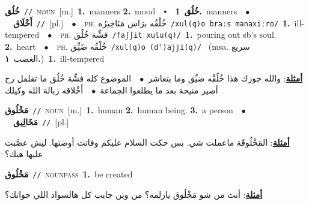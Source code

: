 \documentclass[10pt,a4paper,twoside]{article} %
\begin{document}
\begin{multicols}{2}
{\setlength\topsep{0pt}\textbf{\foreignlanguage{arabic}{خُلُق}}\ {\color{gray}\texttt{//}\color{black}}\ \textsc{noun}\ [m.]\ \textbf{1.}~manners  \textbf{2.}~mood\ \ $\smblkdiamond$\ \ \setlength\topsep{0pt}\textbf{\foreignlanguage{arabic}{خُلُق}}\ \textbf{1.}~manners\ \ $\bullet$\ \ \setlength\topsep{0pt}\textbf{\foreignlanguage{arabic}{أَخْلَاق}}\ {\color{gray}\texttt{//}\color{black}}\ [pl.]\ \ $\bullet$\ \ \textsc{ph.} \color{gray} \foreignlanguage{arabic}{خُلْقُه برَاس مَنَاخِيرُه}\color{black}\ {\color{gray}\texttt{/{\sffamily xul(q)o braːs manaxiːro}/}\color{black}}\ \textbf{1.}~ill-tempered\ \ $\bullet$\ \ \textsc{ph.} \color{gray} \foreignlanguage{arabic}{فشِّة خُلُق}\color{black}\ {\color{gray}\texttt{/{\sffamily faʃʃit xulu(q)}/}\color{black}}\ \textbf{1.}~pouring out sb's soul.  \textbf{2.}~heart\ \ $\bullet$\ \ \textsc{ph.} \color{gray} \foreignlanguage{arabic}{خُلْقُه ضَيِّق}\color{black}\ {\color{gray}\texttt{/{\sffamily xul(q)o (dˤ)ajji(q)}/}\color{black}}\ \color{gray} (msa. \foreignlanguage{arabic}{سريع الغضب}~\foreignlanguage{arabic}{\textbf{١.}})\color{black}\ \textbf{1.}~ill-tempered\  \begin{flushright}\color{gray}\foreignlanguage{arabic}{\textbf{\underline{\foreignlanguage{arabic}{أمثلة}}}: والله جوزك هذا خُلُقْه ضيِّق وما بتعاشر\ $\bullet$\ \  الموضوع كله فشِّة خُلُق ما تقلقل رح أصير منيحة بعد ما يطلعوا الجماعة\ $\bullet$\ \  أَخْلاقه زبالة الله وكيلك}\end{flushright}\color{black}} \vspace{2mm}

{\setlength\topsep{0pt}\textbf{\foreignlanguage{arabic}{مَخْلُوق}}\ {\color{gray}\texttt{//}\color{black}}\ \textsc{noun}\ [m.]\ \textbf{1.}~human  \textbf{2.}~human being.  \textbf{3.}~a person\ \ $\bullet$\ \ \setlength\topsep{0pt}\textbf{\foreignlanguage{arabic}{مَخَالِيق}}\ {\color{gray}\texttt{//}\color{black}}\ [pl.]\  \begin{flushright}\color{gray}\foreignlanguage{arabic}{\textbf{\underline{\foreignlanguage{arabic}{أمثلة}}}: المَخْلُوقَة ماعملت شي. بس حكت السلام عليكم وفاتت أوضتها. ليش عصَّبت عليها هيك؟}\end{flushright}\color{black}} \vspace{2mm}

{\setlength\topsep{0pt}\textbf{\foreignlanguage{arabic}{مَخْلُوق}}\ {\color{gray}\texttt{//}\color{black}}\ \textsc{noun\textunderscore pass}\ \textbf{1.}~be created\  \begin{flushright}\color{gray}\foreignlanguage{arabic}{\textbf{\underline{\foreignlanguage{arabic}{أمثلة}}}: أنت من شو مَخْلُوق يازلمة؟ من وين جايب كل هالسواد اللي جواتك؟}\end{flushright}\color{black}} \vspace{2mm}


\end{multicols}
\end{document}
